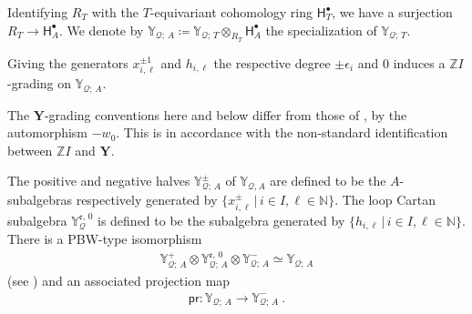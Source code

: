 \documentclass[reqno,a4paper]{amsart}
\newcommand{\N}{\mathbb{N}}
\newcommand{\Y}{\mathbb{Y}}
\newcommand{\Z}{\mathbb{Z}}
\newcommand{\bfY}{\mathbf{Y}}
\newcommand{\qv}{\mathcal{Q}}
\newcommand{\rootlattice}{\bfY}
\newcommand{\zeroeY}{\mathbb{Y}^{\mathfrak{e},\, 0}}
\newcommand{\Hbullet}{\mathsf{H}^\bullet}
\newcommand{\pr}{\mathsf{pr}}
\theoremstyle{basic-theorem}
\numberwithin{equation}{section}
\begin{document}
\begin{notation}
	Identifying $R_T$ with the $T$-equivariant cohomology ring $\Hbullet_T$, we have a surjection $R_T \to \Hbullet_A$. We denote by $\Y_{\qv;\, A}\coloneq \Y_{\qv;\,T} \otimes_{R_T} \Hbullet_A$ the specialization of $\Y_{\qv;\,T}$. 
\end{notation}

\begin{remark} 
		Giving the generators $x^{\pm 1}_{i,\ell}$ and $h_{i,\ell}$ the respective degree $\pm \epsilon_i$ and $0$ induces a $\Z I$-grading on $\Y_{\qv;\,A}$.
	
	The $\rootlattice$-grading conventions here and below differ from those of \cite{DPSSV-3}, by the automorphism $-w_0$. This is in accordance with the non-standard identification between $\Z I$ and $\rootlattice$. 
\end{remark}	

The positive and negative halves $\Y^\pm_{\qv;\,A}$ of $\Y_{\qv,A}$ are defined to be the $A$-subalgebras respectively generated by $\{x^{\pm}_{i,\ell}\,|\, i \in I, \ell \in \N\}$. The loop Cartan subalgebra $\zeroeY_\qv$ is defined to be the subalgebra generated by $\{h_{i,\ell}\,|\, i \in I, \ell \in \N\}$. There is a PBW-type isomorphism
\begin{align}
	\Y^+_{\qv;\,A}\otimes \zeroeY_{\qv;\,A}\otimes \Y^-_{\qv;\,A} \simeq \Y_{\qv;\,A}
\end{align}
(see \cite[Theorem~\ref*{COHA-Yangian-thm:triangular-decomposition-affine}]{DPSSV-3}) and an associated projection map
\begin{align}\label{eq:projection}
	\pr\colon \Y_{\qv;\,A} \longrightarrow \Y^-_{\qv;\,A}\ .
\end{align}
\end{document}

